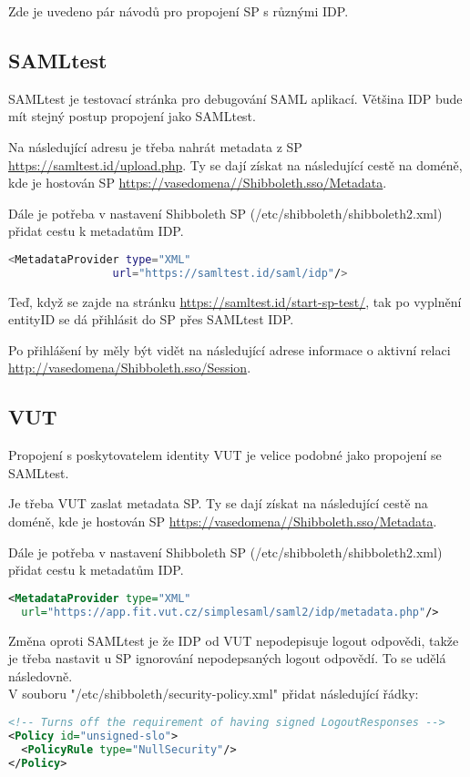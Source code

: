 Zde je uvedeno pár návodů pro propojení SP s různými IDP.

\subsection{SAMLtest}
SAMLtest je testovací stránka pro debugování SAML aplikací. Většina IDP bude mít stejný postup propojení jako SAMLtest.



Na následující adresu je třeba nahrát metadata z SP 
\url{https://samltest.id/upload.php}. Ty se dají získat na následující cestě na doméně, kde je hostován SP \url{https://vasedomena//Shibboleth.sso/Metadata}.

Dále je potřeba v nastavení Shibboleth SP (/etc/shibboleth/shibboleth2.xml) přidat cestu k metadatům IDP.
\begin{lstlisting}[language=Bash]
 <MetadataProvider type="XML"
                url="https://samltest.id/saml/idp"/>
\end{lstlisting}

Teď, když se zajde na stránku \url{https://samltest.id/start-sp-test/}, tak po vyplnění entityID se dá přihlásit do SP přes SAMLtest IDP.

Po přihlášení by měly být vidět na následující adrese informace o aktivní relaci \url{http://vasedomena/Shibboleth.sso/Session}.

\subsection{VUT}
Propojení s poskytovatelem identity VUT je velice podobné jako propojení se SAMLtest.



Je třeba VUT zaslat metadata SP. Ty se dají získat na následující cestě na doméně, kde je hostován SP \url{https://vasedomena//Shibboleth.sso/Metadata}.

Dále je potřeba v nastavení Shibboleth SP (/etc/shibboleth/shibboleth2.xml) přidat cestu k metadatům IDP.
\begin{lstlisting}[language=XML]
 <MetadataProvider type="XML"
  url="https://app.fit.vut.cz/simplesaml/saml2/idp/metadata.php"/>
\end{lstlisting}

Změna oproti SAMLtest je že IDP od VUT nepodepisuje logout odpovědi, takže je třeba nastavit u SP ignorování nepodepsaných logout odpovědí. To se udělá následovně.\\
V souboru  "/etc/shibboleth/security-policy.xml" přidat následující řádky:
\begin{lstlisting}[language=XML]
<!-- Turns off the requirement of having signed LogoutResponses -->
<Policy id="unsigned-slo">
  <PolicyRule type="NullSecurity"/>
</Policy>
\end{lstlisting}

